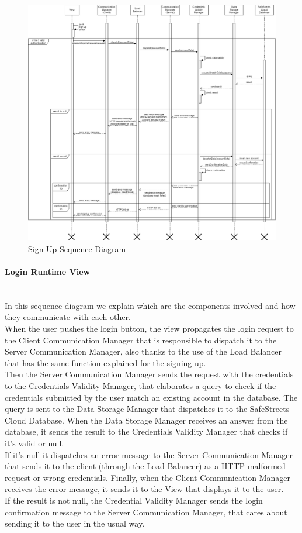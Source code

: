 \documentclass[titlepage]{article}
\begin{document}
\begin{figure}[h]
	\includegraphics[scale=0.39]{Diagrams/Sequence Diagrams/Runtime View Diagram signup.png}
	\caption{Sign Up Sequence Diagram}
\end{figure}
\FloatBarrier

\paragraph{Login Runtime View \\ \\}

In this sequence diagram we explain which are the components involved and how they communicate with each other. \\
When the user pushes the login button, the view propagates the login request to the Client Communication Manager that is responsible to dispatch it to the Server Communication Manager, also thanks to the use of the Load Balancer that has the same function explained for the signing up. \\
Then the Server Communication Manager sends the request with the credentials to the Credentials Validity Manager, that elaborates a query to check if the credentials submitted by the user match an existing account in the database. The query is sent to the Data Storage Manager that dispatches it to the SafeStreets Cloud Database. When the Data Storage Manager receives an answer from the database, it sends the result to the Credentials Validity Manager that checks if it's valid or null. \\
If it's null it dispatches an error message to the Server Communication Manager that sends it to the client (through the Load Balancer) as a HTTP malformed request or wrong credentials. Finally, when the Client Communication Manager receives the error message, it sends it to the View that displays it to the user.\\
If the result is not null, the Credential Validity Manager sends the login confirmation message to the Server Communication Manager, that cares about sending it to the user in the usual way.
\end{document}
